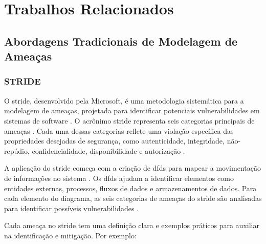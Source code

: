 
%

\chapter{Trabalhos Relacionados}
\label{cha:related_work}

\glsresetall

\section{Abordagens Tradicionais de Modelagem de Ameaças}
\label{sec:traditional_threat_modeling}

\subsection{STRIDE}
\label{subsec:stride}

O \gls{stride}, desenvolvido pela Microsoft, é uma metodologia sistemática
para a modelagem de ameaças, projetada para identificar potenciais
vulnerabilidades em sistemas de software \cite{MicrosoftThreatModelingTechnique}.
O acrônimo \gls{stride} representa seis categorias principais
de ameaças \cite{ThreatModelingdesigningForSecurity}.
Cada uma dessas categorias reflete uma violação específica das
propriedades desejadas de segurança, como autenticidade,
integridade, não-repúdio, confidencialidade, disponibilidade e autorização
\cite{MicrosoftThreatModelingTechnique}.

A aplicação do \gls{stride} começa com a criação de \gls{dfds}
para mapear a movimentação de informações no sistema
\cite{UncoverSecurityDesignFlawsSTRIDE}. Os \gls{dfds} ajudam a identificar
elementos como entidades externas, processos, fluxos de dados e
armazenamentos de dados. Para cada elemento do diagrama, as seis
categorias de ameaças do \gls{stride} são analisadas para identificar
possíveis vulnerabilidades \cite{ThreatModelingdesigningForSecurity}.

Cada ameaça no \gls{stride} tem uma definição clara e exemplos práticos para
auxiliar na identificação e mitigação. Por exemplo:

